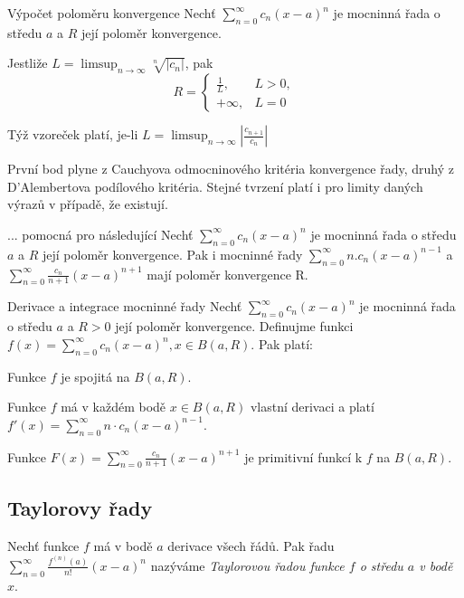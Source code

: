 \begin{vetaN}{Výpočet poloměru konvergence}
Nechť $\sum_{n=0}^{\infty} c_n(x-a)^n$ je mocninná řada o středu $a$ a $R$ její poloměr konvergence.
\begin{penumerate}
	\item Jestliže $L = \limsup_{n \rightarrow \infty} \sqrt[n]{|c_n|}$, pak
		$$R=\left\{ \begin{array}{ll} \frac{1}{L}, & L>0, \\ +\infty, & L=0 \end{array}\right.$$
	\item Týž vzoreček platí, je-li $L = \limsup_{n \rightarrow \infty} \left|\frac{c_{n+1}}{c_n}\right|$
\end{penumerate}
První bod plyne z Cauchyova odmocninového kritéria konvergence řady, druhý z D'Alembertova podílového kritéria. Stejné tvrzení platí i pro limity daných výrazů v případě, že existují.
\end{vetaN}

\begin{vetaN}{... pomocná pro následující}
Nechť $\sum_{n=0}^{\infty} c_n(x-a)^n$ je mocninná řada o středu $a$ a $R$ její poloměr konvergence. Pak i mocninné řady $\sum_{n=0}^{\infty} n.c_n(x-a)^{n-1}$ a $\sum_{n=0}^{\infty} \frac{c_n}{n+1}(x-a)^{n+1}$ mají poloměr konvergence R.
\end{vetaN}

\begin{vetaN}{Derivace a integrace mocninné řady}
Nechť $\sum_{n=0}^{\infty} c_n(x-a)^n$ je mocninná řada o středu $a$ a $R>0$ její poloměr konvergence. Definujme funkci $f(x) = \sum_{n=0}^{\infty} c_n(x-a)^n, x \in B(a,R)$. Pak platí:
\begin{penumerate}
	\item Funkce $f$ je spojitá na $B(a, R)$.
	\item Funkce $f$ má v každém bodě $x \in B(a,R)$ vlastní derivaci a platí $f'(x) = \sum_{n=0}^{\infty} n\cdot c_n(x-a)^{n-1}$.
	\item Funkce $F(x) = \sum_{n=0}^{\infty} \frac{c_n}{n+1}(x-a)^{n+1}$ je primitivní funkcí k $f$ na $B(a, R)$.
\end{penumerate}
\end{vetaN}


\subsection{Taylorovy řady}

\begin{definice}
Nechť funkce $f$ má v bodě $a$ derivace všech řádů. Pak řadu $\sum_{n=0}^{\infty} \frac{f^{(n)}(a)}{n!}(x-a)^n$ nazýváme \emph{Taylorovou řadou funkce $f$ o středu $a$ v bodě $x$}.
\end{definice}

